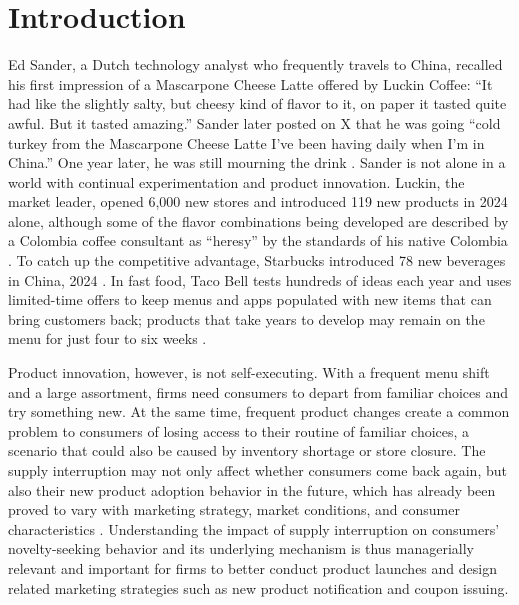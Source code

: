 \documentclass[11 pt]{article}
\begin{document}
\section{Introduction}
\label{section:Introduction}

Ed Sander, a Dutch technology analyst who frequently travels to China, recalled his first impression of a Mascarpone Cheese Latte offered by Luckin Coffee: ``It had like the slightly salty, but cheesy kind of flavor to it, on paper it tasted quite awful. But it tasted amazing.'' Sander later posted on X that he was going ``cold turkey from the Mascarpone Cheese Latte I've been having daily when I'm in China.'' One year later, he was still mourning the drink \citep{emont2025coffeewar}. Sander is not alone in a world with continual experimentation and product innovation. Luckin, the market leader, opened 6,000 new stores and introduced 119 new products in 2024 alone, although some of the flavor combinations being developed are described by a Colombia coffee consultant as ``heresy'' by the standards of his native Colombia \citep{emont2025coffeewar}. To catch up the competitive advantage, Starbucks introduced 78 new beverages in China, 2024 \citep{chinadaily2026starbucks}. In fast food, Taco Bell tests hundreds of ideas each year and uses limited-time offers to keep menus and apps populated with new items that can bring customers back; products that take years to develop may remain on the menu for just four to six weeks \citep{haddon2025tacobell}.

Product innovation, however, is not self-executing. With a frequent menu shift and a large assortment, firms need consumers to depart from familiar choices and try something new. At the same time, frequent product changes create a common problem to consumers of losing access to their routine of familiar choices, a scenario that could also be caused by inventory shortage or store closure. The supply interruption may not only affect whether consumers come back again, but also their new product adoption behavior in the future, which has already been proved to vary with marketing strategy, market conditions, and consumer characteristics \citep{steenkamp2003trial}. Understanding the impact of supply interruption on consumers' novelty-seeking behavior and its underlying mechanism is thus managerially relevant and important for firms to better conduct product launches \citep{talay2024recession,ward2025recession} and design related marketing strategies such as new product notification and coupon issuing.
\end{document}
